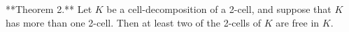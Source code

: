 **Theorem 2.** Let $K$ be a cell-decomposition of a 2-cell, and suppose that $K$ has more than one 2-cell. Then at least two of the 2-cells of $K$ are free in $K$.
